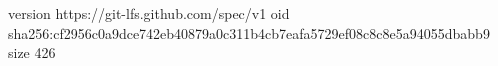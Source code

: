 version https://git-lfs.github.com/spec/v1
oid sha256:cf2956c0a9dce742eb40879a0c311b4cb7eafa5729ef08c8c8e5a94055dbabb9
size 426
